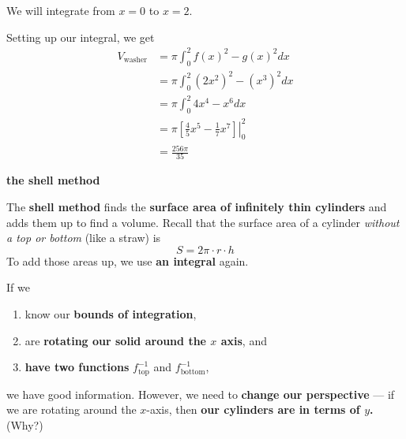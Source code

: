\documentclass[11pt,serif,aspectratio=169]{beamer}
\newcommand{\inverse}[1]{#1^{-1}}
\begin{document}
	\begin{frame}\centering\Large
		We will integrate from $x=0$ to $x=2$.		
	\end{frame}
	
	\begin{frame}
		Setting up our integral, we get	
		\begin{align*}
			V_\text{washer} &= \pi \int_0^2 f(x)^2 - g(x)^2 dx \\
			&= \pi \int_0^2 (2x^2)^2 - (x^3)^2 dx \\
			&= \pi \int_0^2 4x^4 - x^6 dx \\
			&= \left. \pi \left[\frac 45 x^5 - \frac 17 x^7 \right] \right|_0^2 \\
			&= \frac{256 \pi}{35}
		\end{align*}
	\end{frame}
	
	\begin{frame}\centering \Large \bf
		the shell method	
	\end{frame}
	
	\begin{frame}
		The \textbf{shell method} finds the \textbf{surface area of infinitely thin cylinders} and adds them up to find a volume. Recall that the surface area of a cylinder \textit{without a top or bottom} (like a straw) is $$ S = 2\pi \cdot r \cdot h $$ To add those areas up, we use \textbf{an integral} again.
	\end{frame}
	
	\begin{frame}
		If we
		\begin{enumerate}[label=(\roman*)]
			\item know our \textbf{bounds of integration},
			\item are \textbf{rotating our solid around the $x$ axis}, and
			\item \textbf{have two functions} $\inverse f_{\text{top}}$ and $\inverse f_{\text{bottom}}$,
		\end{enumerate}
		we have good information. However, we need to \textbf{change our perspective} --- if we are rotating around the $x$-axis, then \textbf{our cylinders are in terms of $y$.} (Why?)
	\end{frame}
\end{document}
